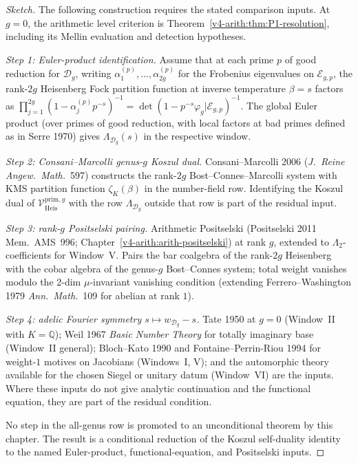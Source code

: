 \begin{proof}[Sketch]
The following construction requires the stated comparison inputs.
At \(g=0\), the arithmetic level criterion is
Theorem~\ref{v4-arith:thm:P1-resolution}, including its Mellin
evaluation and detection hypotheses.

\emph{Step 1: Euler-product identification.} Assume that at each prime \(p\) of good
reduction for \(\mathcal{D}_g\), writing \(\alpha_1^{(p)},\ldots,\alpha_{2g}^{(p)}\)
for the Frobenius eigenvalues on \(\mathcal{E}_{g,p}\), the rank-\(2g\)
Heisenberg Fock partition function at inverse temperature \(\beta=s\) factors as
\(\prod_{j=1}^{2g}(1-\alpha_j^{(p)}p^{-s})^{-1}
=\det(1-p^{-s}\varphi_g|\mathcal{E}_{g,p})^{-1}\).
The global Euler product (over primes of good reduction, with local factors
at bad primes defined as in Serre 1970) gives \(\Lambda_{\mathcal{D}_g}(s)\)
in the respective window.

\emph{Step 2: Consani--Marcolli genus-\(g\) Koszul dual.}
Consani--Marcolli 2006 (\emph{J.~Reine Angew.~Math.}~597) constructs the
rank-\(2g\) Bost--Connes--Marcolli system with KMS partition function
\(\zeta_K(\beta)\) in the number-field row. Identifying the Koszul dual
of \(\mathcal{V}^{\mathrm{prim},g}_{\mathrm{Heis}}\) with the row
\(\Lambda_{\mathcal{D}_g}\) outside that row is part of the residual
input.

\emph{Step 3: rank-\(g\) Positselski pairing.} Arithmetic Positselski
(Positselski 2011 Mem.~AMS~996; Chapter~\ref{v4-arith:arith-positselski})
at rank \(g\), extended to \(\Lambda_2\)-coefficients for Window~V. Pairs the
bar coalgebra of the rank-\(2g\) Heisenberg with the cobar algebra of the
genus-\(g\) Bost--Connes system; total weight vanishes modulo the 2-dim
\(\mu\)-invariant vanishing condition (extending Ferrero--Washington 1979
\emph{Ann.~Math.}~109 for abelian at rank \(1\)).

\emph{Step 4: adelic Fourier symmetry \(s\mapsto w_{\mathcal{D}_g}-s\).}
Tate 1950 at \(g=0\) (Window~II with \(K=\mathbb{Q}\)); Weil 1967 \emph{Basic
Number Theory} for totally imaginary base (Window~II general); Bloch--Kato
1990 and Fontaine--Perrin-Riou 1994 for weight-\(1\) motives on Jacobians
(Windows~I, V); and the automorphic theory available for the chosen
Siegel or unitary datum (Window~VI) are the inputs. Where these inputs
do not give analytic continuation and the functional equation, they are
part of the residual condition.

No step in the all-genus row is promoted to an unconditional theorem by
this chapter. The result is a conditional reduction of the Koszul
self-duality identity to the named Euler-product, functional-equation,
and Positselski inputs.
\end{proof}

